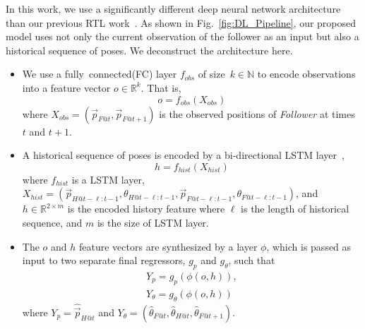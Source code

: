 \documentclass[letterpaper, 10 pt, conference]{ieeeconf}  %
\begin{document}
    In this work, we use a significantly different deep neural network
    architecture than our previous RTL work~\cite{CPR17}. As shown in
    Fig.~\ref{fig:DL_Pipeline}, our proposed model uses not only the
    current observation of the follower as an input but also a
    historical sequence of poses. We deconstruct the architecture here.
    \begin{itemize}
        \item We use a fully~connected(FC) layer $f_{obs}$ of size~$k
            \in \mathbb{N}$ to encode
            observations into a feature vector $o \in \mathbb{R}^k$.
            That is,
            \begin{equation}
                o = f_{obs}(X_{obs})
            \end{equation}
            where $X_{obs} = (\vec{p}_{F@t},\vec{p}_{F@t+1})$ is the
            observed positions of \emph{Follower} at times $t$ and $t+1$.

        \item A historical sequence of poses is encoded by a
            bi-directional LSTM layer~\cite{Wu16},
            \begin{equation}
                h = f_{hist}(X_{hist})
            \end{equation}
            where $f_{hist}$ is a LSTM layer, $X_{hist} =
            (\vec{p}_{H@t-\ell:t-1}, \theta_{H@t-\ell:t-1},
            \vec{p}_{F@t-\ell:t-1}, \theta_{F@t-\ell:t-1})$, and $h \in
            \mathbb{R}^{2 \times m}$ is the encoded history feature
            where $\ell$ is the length of historical sequence, and $m$ is
            the size of LSTM layer.

        \item The $o$ and $h$ feature vectors are synthesized by a layer
           $\phi$, which is passed as input to two separate final
           regressors, $g_{p}$ and $g_\theta$, such that
            \begin{equation}
                \begin{split}
                Y_{p} = g_{p}(\phi(o, h)),\\
                Y_{\theta}= g_{\theta}(\phi(o, h))
                \end{split}
                \label{eq:regression_output}
            \end{equation}
            where $Y_{p} = \hat{\vec{p}}_{H@t}$ and $Y_{\theta} =
            (\hat{\theta}_{F@t}, \hat{\theta}_{H@t},
            \hat{\theta}_{F@t+1})$.


\end{itemize}
\end{document}
